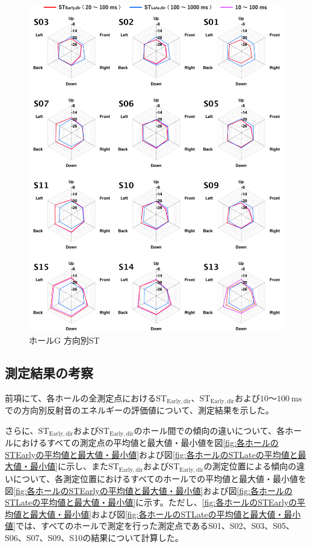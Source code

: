 \documentclass[11pt,a4j]{jreport}
\begin{document}
\newpage

\begin{figure}[H]
  \centering
  \includegraphics[scale=.77]{images/realHallDirSt/allPoint/reshaped/gRightPage.pdf}
  \caption{ホールG 方向別ST}
  \label{fig:ホールG 方向別ST}
\end{figure}

\clearpage

\subsection{測定結果の考察}

前項にて、各ホールの全測定点における$\mathrm{ST_{Early,dir}}$、$\mathrm{ST_{Early,dir}}$および$10$～$\SI{100}{\ms}$での方向別反射音のエネルギーの評価値について、測定結果を示した。

さらに、$\mathrm{ST_{Early,dir}}$および$\mathrm{ST_{Early,dir}}$のホール間での傾向の違いについて、各ホールにおけるすべての測定点の平均値と最大値・最小値を図\ref{fig:各ホールのSTEarlyの平均値と最大値・最小値}および図\ref{fig:各ホールのSTLateの平均値と最大値・最小値}に示し、また$\mathrm{ST_{Early,dir}}$および$\mathrm{ST_{Early,dir}}$の測定位置による傾向の違いについて、各測定位置におけるすべてのホールでの平均値と最大値・最小値を図\ref{fig:各ホールのSTEarlyの平均値と最大値・最小値}および図\ref{fig:各ホールのSTLateの平均値と最大値・最小値}に示す。ただし、\ref{fig:各ホールのSTEarlyの平均値と最大値・最小値}および図\ref{fig:各ホールのSTLateの平均値と最大値・最小値}では、すべてのホールで測定を行った測定点であるS01、S02、S03、S05、S06、S07、S09、S10の結果について計算した。
\end{document}

